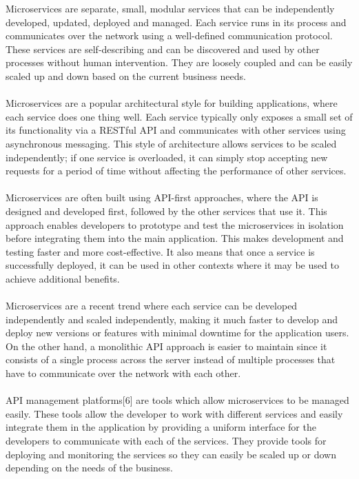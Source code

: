 \documentclass[BIF,Master,nenglish]{twbook}%
\begin{document}
\noindent
Microservices are separate, small, modular services that can be independently developed, updated, deployed and managed. Each service runs in its process and communicates over the network using a well-defined communication protocol.\cite{fow2014} These services are self-describing and can be discovered and used by other processes without human intervention. They are loosely coupled and can be easily scaled up and down based on the current business needs.
\\
\\
Microservices are a popular architectural style for building applications, where each service does one thing well. Each service typically only exposes a small set of its functionality via a RESTful API and communicates with other services using asynchronous messaging.\cite{gooMes} This style of architecture allows services to be scaled independently; if one service is overloaded, it can simply stop accepting new requests for a period of time without affecting the performance of other services.
\\
\\
Microservices are often built using API-first approaches, where the API is designed and developed first, followed by the other services that use it. This approach enables developers to prototype and test the microservices in isolation before integrating them into the main application. This makes development and testing faster and more cost-effective. It also means that once a service is successfully deployed, it can be used in other contexts where it may be used to achieve additional benefits.
\\
\\
Microservices are a recent trend where each service can be developed independently and scaled independently, making it much faster to develop and deploy new versions or features with minimal downtime for the application users. On the other hand, a monolithic API approach is easier to maintain since it consists of a single process across the server instead of multiple processes that have to communicate over the network with each other. \cite{pat2021}
\\
\\
API management platforms[6] are tools which allow microservices to be managed easily. These tools allow the developer to work with different services and easily integrate them in the application by providing a uniform interface for the developers to communicate with each of the services. They provide tools for deploying and monitoring the services so they can easily be scaled up or down depending on the needs of the business.
\end{document}
